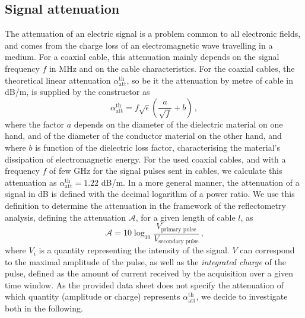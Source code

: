 \subsection{Signal attenuation}
\label{subsec:attenuation}
The attenuation of an electric signal is a problem common to all electronic fields, and comes from the charge loss of an electromagnetic wave travelling in a medium.
For a coaxial cable, this attenuation mainly depends on the signal frequency $f$ in MHz and on the cable characteristics.
For the coaxial cables, the theoretical linear attenuation $\alpha_{\text{att}}^{\text{th}}$, so be it the attenuation by metre of cable in dB/m, is supplied by the constructor as
\begin{equation}
  \alpha_{\text{att}}^{\text{th}} = f\sqrt{\epsilon}(\frac{a}{\sqrt{f}}+b)\,,
\end{equation}
where the factor $a$ depends on the diameter of the dielectric material on one hand, and of the diameter of the conductor material on the other hand, and where $b$ is function of the dielectric loss factor, characterising the material's dissipation of electromagnetic energy.
For the used coaxial cables, and with a frequency $f$ of few GHz for the signal pulses sent in cables, we calculate this attenuation as $\alpha_{\text{att}}^{\text{th}} = 1.22$ dB/m.
In a more general manner, the attenuation of a signal in dB is defined with the decimal logarithm of a power ratio.
We use this definition to determine the attenuation in the framework of the reflectometry analysis, defining the attenuation $\mathcal{A}$, for a given length of cable $l$, as
\begin{equation}
  \mathcal{A}=10\log_{10}\frac{V_{\text{primary pulse}}}{V_{\text{secondary pulse}}} \,\text{,}
\end{equation}
where $V_{i}$ is a quantity representing the intensity of the signal.
$V$ can correspond to the maximal amplitude of the pulse, as well as the \emph{integrated charge} of the pulse, defined as the amount of current received by the acquisition over a given time window.
As the provided data sheet does not specify the attenuation of which quantity (amplitude or charge) represents $\alpha_{\text{att}}^{\text{th}}$, we decide to investigate both in the following.
